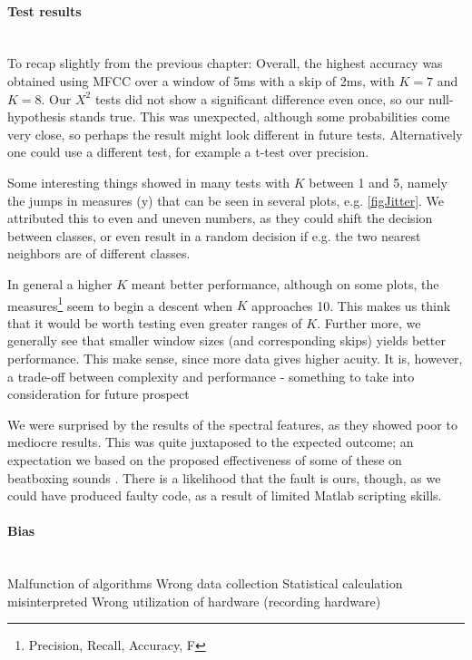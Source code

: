 \paragraph{Test results} \hspace{0pt} \\
To recap slightly from the previous chapter: Overall, the highest accuracy was obtained using MFCC over a window of 5ms with a skip of 2ms, with $K=7$ and $K=8$. Our $X^2$ tests did not show a significant difference even once, so our null-hypothesis stands true. This was unexpected, although some probabilities come very close, so perhaps the result might look different in future tests. Alternatively one could use a different test, for example a t-test over precision.

Some interesting things showed in many tests with $K$ between 1 and 5, namely the jumps in measures (y) that can be seen in several plots, e.g. \ref{figJitter}. We attributed this to even and uneven numbers, as they could shift the decision between classes, or even result in a random decision if e.g. the two nearest neighbors are of different classes.

In general a higher $K$ meant better performance, although on some plots, the measures\footnote{Precision, Recall, Accuracy, F} seem to begin a descent when $K$ approaches 10. This makes us think that it would be worth testing even greater ranges of $K$. 
Further more, we generally see that smaller window sizes (and corresponding skips) yields better performance. This make sense, since more data gives higher acuity. It is, however, a trade-off between complexity and performance - something to take into consideration for future prospect

We were surprised by the results of the spectral features, as they showed poor to mediocre results. This was quite juxtaposed to the expected outcome; an expectation we based on the proposed effectiveness of some of these on beatboxing sounds \citep{Sinyor05}. There is a likelihood that the fault is ours, though, as we could have produced faulty code, as a result of limited Matlab scripting skills.

\paragraph{Bias} \hspace{0pt} \\
Malfunction of algorithms
Wrong data collection
Statistical calculation misinterpreted
Wrong utilization of hardware (recording hardware)

